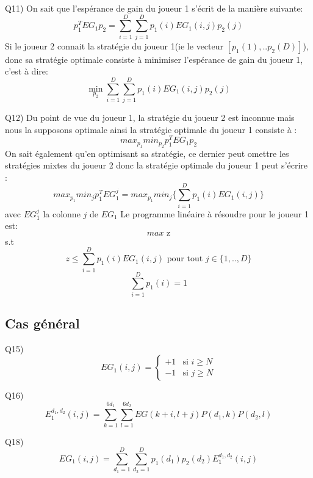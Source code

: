 \documentclass[12pt]{article}
\begin{document}
Q11) On sait que l'espérance de gain du joueur 1 s'écrit de la manière suivante:
$$p_1^T EG_1 p_2 = \sum_{i=1}^D \sum_{j=1}^D p_1(i)EG_1(i,j)p_2(j)$$
Si le joueur 2 connait la stratégie du joueur 1(ie le vecteur $[p_1(1),.. p_2(D)]$), donc sa stratégie optimale consiste à minimiser l'espérance de gain du joueur 1, c'est à dire:
$$ \min_{p_2} \sum_{i=1}^D \sum_{j=1}^D p_1(i)EG_1(i,j)p_2(j)$$

\newline
Q12) Du point de vue du joueur 1, la stratégie du joueur 2 est inconnue mais nous la supposons optimale ainsi la stratégie optimale du joueur 1 consiste à : 
$$max_{p_1} min_{p_2} p_1^T EG_1 p_2$$
On sait également qu'en optimisant sa stratégie, ce dernier peut omettre les stratégies mixtes du joueur 2 donc la stratégie optimale du joueur 1 peut s'écrire : 
$$max_{p_1} min_{j} p_1^T EG_1^j = max_{p_1} min_{j} \{\sum_{i=1}^D p_1(i)EG_1(i,j)\}$$ 
avec $EG_1^j$ la colonne $j$ de $EG_1$
Le programme linéaire à résoudre pour le joueur 1 est:
$$ max \mbox{ z} $$
s.t
$$ z \leq \sum_{i=1}^D p_1(i) EG_1(i,j) \mbox{ pour tout } j \in \{1,..,D\}$$
$$\sum_{i=1}^D p_1(i) = 1$$


\subsection{Cas général}

Q15)$$
EG_1(i,j) = \left\{
    \begin{array}{ll}
        +1 & \mbox{si } i \geq N \\
        -1 & \mbox{si } j \geq N
    \end{array}
\right.
$$

Q16)
$$E_1^{d_1,d_2}(i,j) = \sum_{k=1}^{6d_1} \sum_{l=1}^{6d_2} EG(k+i,l+j)P(d_1,k)P(d_2,l)$$

Q18) 
$$EG_1(i,j) = \sum_{d_1=1}^{D} \sum_{d_2=1}^{D}p_1(d_1)p_2(d_2)E_1^{d_1,d_2}(i,j)$$
\end{document}
